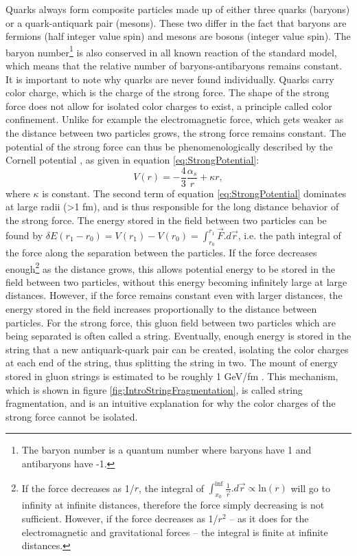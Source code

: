 Quarks always form composite particles made up of either three quarks (baryons) or a quark-antiquark pair (mesons). %
These two differ in the fact that baryons are fermions (half integer value spin) and mesons are bosons (integer value spin). The baryon number\footnote{The baryon number is a quantum number where baryons have 1 and antibaryons have -1.} is also conserved in all known reaction of the standard model, which means that the relative number of baryons-antibaryons remains constant. \\
It is important to note why quarks are never found individually. Quarks carry color charge, which is the charge of the strong force. The shape of the strong force does not allow for isolated color charges to exist, a principle called  color confinement. Unlike for example the electromagnetic force, which gets weaker as the distance between two particles grows, the strong force remains constant. The potential of the strong force can thus be phenomenologically described by the Cornell potential \cite{Strong_potential}, as given in equation \ref{eq:StrongPotential}:
\begin{equation}\label{eq:StrongPotential}
    V(r) = -\frac{4}{3}\frac{\alpha_s}{r}+\kappa r,
\end{equation}
where $\kappa$ is constant. The second term of equation \ref{eq:StrongPotential} dominates at large radii (>1 fm), and is thus responsible for the long distance behavior of the strong force. The energy stored in the field between two particles can be found by $\delta E(r_1-r_0) = V(r_1)-V(r_0) = \int_{r_0}^{r_1} \vec{F}.d\vec{r}$, i.e. the path integral of the force along the separation between the particles. If the force decreases enough\footnote{If the force decreases as 1/$r$, the integral of $\int_{x_0}^{\inf} \frac{1}{\vec{r} } .d\vec{r} \propto \mathrm{ln}(r)$ will go to infinity at infinite distances, therefore the force simply decreasing is not sufficient. However, if the force decreases as 1/$r^2$ -- as it does for the electromagnetic and gravitational forces -- the integral is finite at infinite distances.} as the distance grows, this allows potential energy to be stored in the field between two particles, without this energy becoming infinitely large at large distances. However, if the force remains constant even with larger distances, the energy stored in the field increases proportionally to the distance between particles. For the strong force, this gluon field between two particles which are being separated is often called a string. Eventually, enough energy is stored in the string that a new antiquark-quark pair can be created, isolating the color charges at each end of the string, thus splitting the string in two. The mount of energy stored in gluon strings is estimated to be roughly 1 GeV/fm \cite{QCD_string_tension}. This mechanism, which is shown in figure \ref{fig:IntroStringFragmentation}, is called string fragmentation, and is an intuitive explanation for why the color charges of the strong force cannot be isolated. \\


